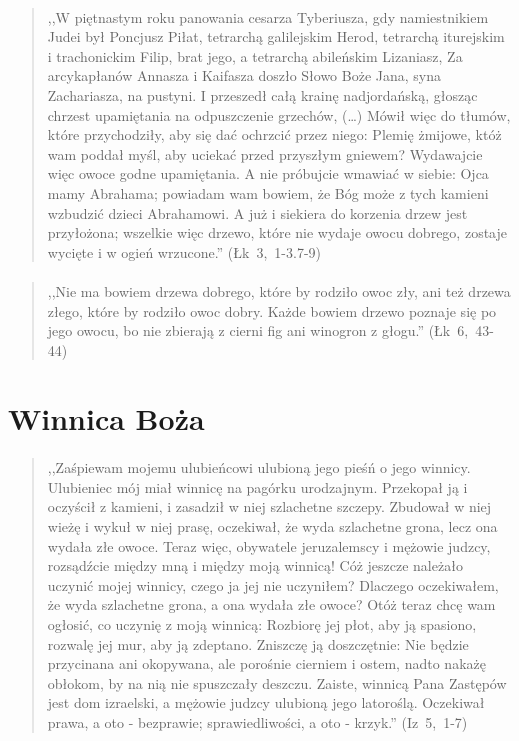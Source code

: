 \documentclass[10pt,a4paper,oneside]{article}
\begin{document}
\paragraph{}
\begin{quote}
,,W piętnastym roku panowania cesarza Tyberiusza, gdy namiestnikiem Judei był Poncjusz Piłat, tetrarchą galilejskim Herod, tetrarchą iturejskim i trachonickim Filip, brat jego, a tetrarchą abileńskim Lizaniasz, Za arcykapłanów Annasza i Kaifasza doszło Słowo Boże Jana, syna Zachariasza, na pustyni. I przeszedł całą krainę nadjordańską, głosząc chrzest upamiętania na odpuszczenie grzechów, (\ldots) Mówił więc do tłumów, które przychodziły, aby się dać ochrzcić przez niego: Plemię żmijowe, któż wam poddał myśl, aby uciekać przed przyszłym gniewem? Wydawajcie więc owoce godne upamiętania. A nie próbujcie wmawiać w siebie: Ojca mamy Abrahama; powiadam wam bowiem, że Bóg może z tych kamieni wzbudzić dzieci Abrahamowi. A już i siekiera do korzenia drzew jest przyłożona; wszelkie więc drzewo, które nie wydaje owocu dobrego, zostaje wycięte i w ogień wrzucone.'' \mbox{(Łk 3, 1-3.7-9)}
\end{quote}
\paragraph{}
\begin{quote}
,,Nie ma bowiem drzewa dobrego, które by rodziło owoc zły, ani też drzewa złego, które by rodziło owoc dobry. Każde bowiem drzewo poznaje się po jego owocu, bo nie zbierają z cierni fig ani winogron z głogu.'' \mbox{(Łk 6, 43-44)}
\end{quote}
\section{Winnica Boża}
\paragraph{}
\begin{quote}
,,Zaśpiewam mojemu ulubieńcowi ulubioną jego pieśń o jego winnicy. Ulubieniec mój miał winnicę na pagórku urodzajnym. Przekopał ją i oczyścił z kamieni, i zasadził w niej szlachetne szczepy. Zbudował w niej wieżę i wykuł w niej prasę, oczekiwał, że wyda szlachetne grona, lecz ona wydała złe owoce. Teraz więc, obywatele jeruzalemscy i mężowie judzcy, rozsądźcie między mną i między moją winnicą! Cóż jeszcze należało uczynić mojej winnicy, czego ja jej nie uczyniłem? Dlaczego oczekiwałem, że wyda szlachetne grona, a ona wydała złe owoce? Otóż teraz chcę wam ogłosić, co uczynię z moją winnicą: Rozbiorę jej płot, aby ją spasiono, rozwalę jej mur, aby ją zdeptano. Zniszczę ją doszczętnie: Nie będzie przycinana ani okopywana, ale porośnie cierniem i ostem, nadto nakażę obłokom, by na nią nie spuszczały deszczu. Zaiste, winnicą Pana Zastępów jest dom izraelski, a mężowie judzcy ulubioną jego latoroślą. Oczekiwał prawa, a oto - bezprawie; sprawiedliwości, a oto - krzyk.'' \mbox{(Iz 5, 1-7)}
\end{quote}
\end{document}
